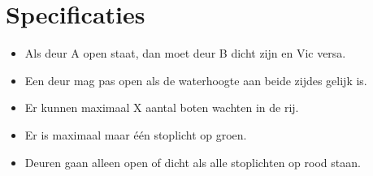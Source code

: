 \documentclass{article}
\begin{document}
\section{Specificaties} %

\begin{itemize}
\item Als deur A open staat, dan moet deur B dicht zijn en Vic versa.

\item Een deur mag pas open als de waterhoogte aan beide zijdes gelijk is.

\item Er kunnen maximaal X aantal boten wachten in de rij.

\item Er is maximaal maar één stoplicht op groen.

\item Deuren gaan alleen open of dicht als alle stoplichten op rood staan.
\end{itemize}

\vskip2cm


\clearpage %
\end{document}
